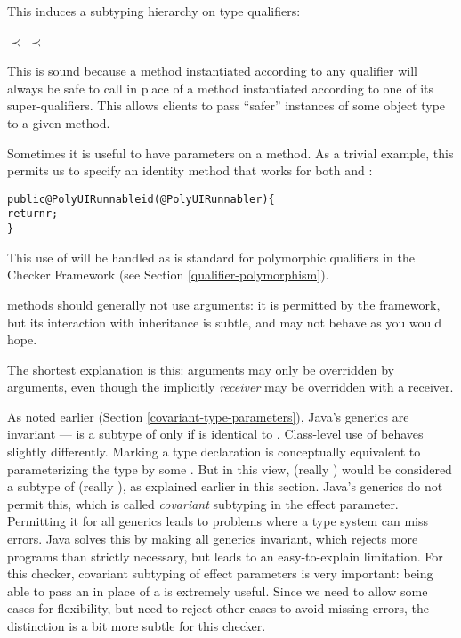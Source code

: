 This induces a subtyping hierarchy on type qualifiers:

\centerline{ $\prec$  $\prec$ }

\noindent
This is sound because a method instantiated according to any qualifier will always be
safe to call in place of a method instantiated according to one of its super-qualifiers.
This allows clients to pass ``safer'' instances of some object type to a given method.



Sometimes it is useful to have  parameters on a method.  As a trivial example, this
permits us to specify an identity method that works for both  and
:

\begin{alltt}
public @PolyUI Runnable id(@PolyUI Runnable r) \{
    return r;
\}
\end{alltt}

\noindent
This use of  will be handled as is standard for polymorphic qualifiers in the Checker
Framework (see Section \ref{qualifier-polymorphism}).

 methods should generally not use  arguments: it is permitted by
the framework, but its interaction with inheritance is subtle, and may not behave as you would
hope.

The shortest explanation is this:  arguments may only be overridden by 
arguments, even though the implicitly  \emph{receiver} may be overridden with a
 receiver.

As noted earlier (Section \ref{covariant-type-parameters}), Java's generics are invariant ---
 is a subtype of  only if  is identical to .
Class-level use of  behaves slightly differently.
Marking a type declaration  is conceptually
equivalent to parameterizing the type by some .  But in this view,
 (really ) would be considered a subtype of
 (really ), as explained earlier in this section.  Java's
generics do not permit this, which is called \emph{covariant} subtyping in the effect parameter.
Permitting it for all generics leads to problems where a type system can miss errors.  Java solves
this by making all generics invariant, which rejects more programs than strictly necessary, but
leads to an easy-to-explain limitation.  For this checker, covariant subtyping of effect parameters
is very important: being able to pass an  in place of a  is extremely useful.  Since we need to allow some
cases for flexibility, but need to reject other cases to avoid missing errors, the distinction is a
bit more subtle for this checker.

